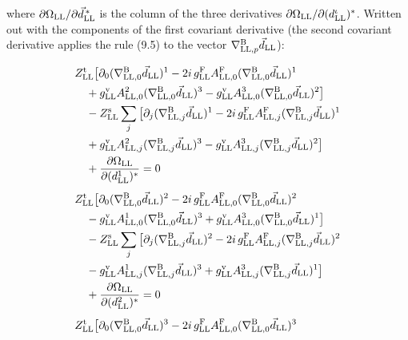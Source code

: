 \documentclass[
  10pt,
]{article}
\begin{document}
where \(\partial\Omega_{\rm LL}/\partial\vec d^{\,*}_{\rm LL}\) is the
column of the three derivatives
\(\partial\Omega_{\rm LL}/\partial(d^\iota_{\rm LL})^*\). Written out
with the components of the first covariant derivative (the second
covariant derivative applies the rule (9.5) to the vector
\(\nabla^{\rm B}_{{\rm LL},p}\vec d_{\rm LL}\)):

\[\begin{aligned}&Z^{\rm t}_{\rm LL}\big[\partial_0(\nabla^{\rm B}_{{\rm LL},0}\vec d_{\rm LL})^1-2i\,g^{\rm F}_{\rm LL}A^{\rm F}_{{\rm LL},0}(\nabla^{\rm B}_{{\rm LL},0}\vec d_{\rm LL})^1\\
&\quad +g^{\rm v}_{\rm LL}A^2_{{\rm LL},0}(\nabla^{\rm B}_{{\rm LL},0}\vec d_{\rm LL})^3-g^{\rm v}_{\rm LL}A^3_{{\rm LL},0}(\nabla^{\rm B}_{{\rm LL},0}\vec d_{\rm LL})^2\big]\\
&\quad-Z^{\rm s}_{\rm LL}\sum_j\big[\partial_j(\nabla^{\rm B}_{{\rm LL},j}\vec d_{\rm LL})^1-2i\,g^{\rm F}_{\rm LL}A^{\rm F}_{{\rm LL},j}(\nabla^{\rm B}_{{\rm LL},j}\vec d_{\rm LL})^1\\
&\quad +g^{\rm v}_{\rm LL}A^2_{{\rm LL},j}(\nabla^{\rm B}_{{\rm LL},j}\vec d_{\rm LL})^3-g^{\rm v}_{\rm LL}A^3_{{\rm LL},j}(\nabla^{\rm B}_{{\rm LL},j}\vec d_{\rm LL})^2\big]\\
&\quad+\frac{\partial\Omega_{\rm LL}}{\partial(d^1_{\rm LL})^*}=0\\[4pt]
&Z^{\rm t}_{\rm LL}\big[\partial_0(\nabla^{\rm B}_{{\rm LL},0}\vec d_{\rm LL})^2-2i\,g^{\rm F}_{\rm LL}A^{\rm F}_{{\rm LL},0}(\nabla^{\rm B}_{{\rm LL},0}\vec d_{\rm LL})^2\\
&\quad -g^{\rm v}_{\rm LL}A^1_{{\rm LL},0}(\nabla^{\rm B}_{{\rm LL},0}\vec d_{\rm LL})^3+g^{\rm v}_{\rm LL}A^3_{{\rm LL},0}(\nabla^{\rm B}_{{\rm LL},0}\vec d_{\rm LL})^1\big]\\
&\quad-Z^{\rm s}_{\rm LL}\sum_j\big[\partial_j(\nabla^{\rm B}_{{\rm LL},j}\vec d_{\rm LL})^2-2i\,g^{\rm F}_{\rm LL}A^{\rm F}_{{\rm LL},j}(\nabla^{\rm B}_{{\rm LL},j}\vec d_{\rm LL})^2\\
&\quad -g^{\rm v}_{\rm LL}A^1_{{\rm LL},j}(\nabla^{\rm B}_{{\rm LL},j}\vec d_{\rm LL})^3+g^{\rm v}_{\rm LL}A^3_{{\rm LL},j}(\nabla^{\rm B}_{{\rm LL},j}\vec d_{\rm LL})^1\big]\\
&\quad+\frac{\partial\Omega_{\rm LL}}{\partial(d^2_{\rm LL})^*}=0\\[4pt]
&Z^{\rm t}_{\rm LL}\big[\partial_0(\nabla^{\rm B}_{{\rm LL},0}\vec d_{\rm LL})^3-2i\,g^{\rm F}_{\rm LL}A^{\rm F}_{{\rm LL},0}(\nabla^{\rm B}_{{\rm LL},0}\vec d_{\rm LL})^3\\

\end{aligned}\]
\end{document}
